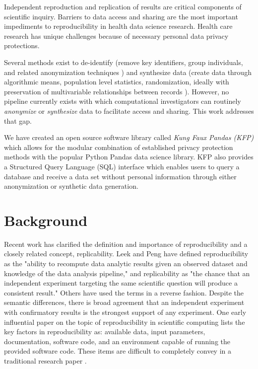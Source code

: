 \documentclass{amia}
\begin{document}
Independent reproduction and replication of results are critical components of scientific inquiry. Barriers to data access and sharing are the most important impediments to reproducibility in health data science research. Health care research has unique challenges because of necessary personal data privacy protections.

Several methods exist to de-identify (remove key identifiers, group individuals, and related anonymization techniques \cite{hippapro}) and synthesize data (create data through algorithmic means, population level statistics, randomization, ideally with preservation of multivariable relationships between records \cite{walonoski_synthea_2018, patki_synthetic_2016, choi_generating_2017}). However, no pipeline currently exists with which computational investigators can routinely \emph{anonymize} or \emph{synthesize} data to facilitate access and sharing. This work addresses that gap.

We have created an open source software library called \emph{Kung Faux Pandas (KFP)} which allows for the modular combination of established privacy protection methods with the popular Python Pandas data science library\cite{mckinney-proc-scipy-2010}. KFP also provides a Structured Query Language (SQL) interface which enables users to query a database and receive a data set without personal information through either anonymization or synthetic data generation.

\section{Background}

Recent work has clarified the definition and importance of reproducibility and a closely related concept, replicability. Leek and Peng have defined reproducibility as the "ability to recompute data analytic results given an observed dataset and knowledge of the data analysis pipeline," and replicability as "the chance that an independent experiment targeting the same scientific question will produce a consistent result."\cite{leek_opinion_2015,peng_reproducible_2006} Others have used the terms in a reverse fashion\cite{drummond_replicability_2009}. Despite the semantic differences, there is broad agreement that an independent experiment with confirmatory results is the strongest support of any experiment. One early influential paper on the topic of reproducibility in scientific computing lists the key factors in reproducibility as: available data, input parameters, documentation, software code, and an environment capable of running the provided software code. These items are difficult to completely convey in a traditional research paper \cite{schwab_making_2000}.
\end{document}
